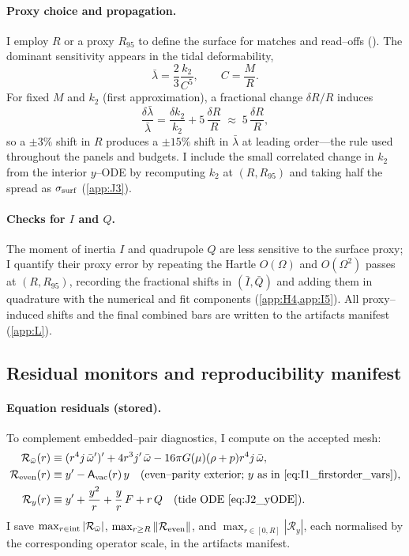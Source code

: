\documentclass{iopjournal}
\begin{document}
\paragraph{Proxy choice and propagation.}
I employ $R$ or a proxy $R_{95}$ to define the surface for matches and read–offs (). The dominant sensitivity appears in the tidal deformability,
\[
\bar\lambda=\frac{2}{3}\frac{k_2}{C^{5}},\qquad C=\frac{M}{R}.
\]
For fixed $M$ and $k_2$ (first approximation), a fractional change $\delta R/R$ induces
\[
\frac{\delta\bar\lambda}{\bar\lambda}
=\frac{\delta k_2}{k_2}+5\,\frac{\delta R}{R}
\;\approx\;5\,\frac{\delta R}{R},
\]
so a $\pm3\%$ shift in $R$ produces a $\pm15\%$ shift in $\bar\lambda$ at leading order—the rule used throughout the panels and budgets. I include the small correlated change in $k_2$ from the interior $y$–ODE by recomputing $k_2$ at $(R,R_{95})$ and taking half the spread as $\sigma_{\rm surf}$ (\cref{app:J3}).

\paragraph{Checks for $I$ and $Q$.}
The moment of inertia $I$ and quadrupole $Q$ are less sensitive to the surface proxy; I quantify their proxy error by repeating the Hartle $O(\Omega)$ and $O(\Omega^2)$ passes at $(R,R_{95})$, recording the fractional shifts in $(\bar{I},\bar{Q})$ and adding them in quadrature with the numerical and fit components (\cref{app:H4,app:I5}). All proxy–induced shifts and the final combined bars are written to the artifacts manifest (\cref{app:L}).

\subsection{Residual monitors and reproducibility manifest}\label{app:K4}
\paragraph{Equation residuals (stored).}
To complement embedded–pair diagnostics, I compute on the accepted mesh:
\begin{align}
\mathcal R_{\bar\omega}(r)&\equiv(r^{4}j\,\bar\omega')'+4r^{3}j'\,\bar\omega-16\pi G(\mu)(\rho+p)r^{4}j\,\bar\omega,
\label{eq:K4_Rdrag}\\
\mathcal R_{\rm even}(r)&\equiv y'-\mathsf A_{\rm vac}(r)\,y\quad\text{(even–parity exterior; $y$ as in \eqref{eq:I1_firstorder_vars})},
\label{eq:K4_Reven}\\
\mathcal R_{y}(r)&\equiv y'+\frac{y^2}{r}+\frac{y}{r}\,F+r\,Q\quad\text{(tide ODE \eqref{eq:J2_yODE})}.
\label{eq:K4_Ry}
\end{align}
I save $\max_{r\in{\rm int}}|\mathcal R_{\bar\omega}|$, $\max_{r\ge R}\|\mathcal R_{\rm even}\|$, and $\max_{r\in[0,R]}|\mathcal R_{y}|$, each normalised by the corresponding operator scale, in the artifacts manifest.
\end{document}
